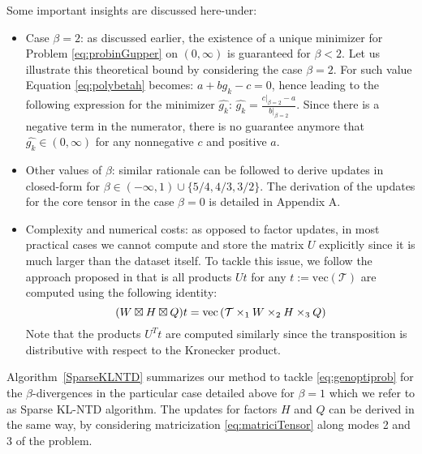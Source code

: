 \documentclass[a4paper, 11pt]{article}
\begin{document}
Some important insights are discussed here-under:
\begin{itemize}
    \item Case $\beta=2$: as discussed earlier, the existence of a unique minimizer for Problem \eqref{eq:probinGupper} on $(0,\infty)$ is guaranteed for $\beta < 2$. Let us illustrate this theoretical bound by considering the case $\beta=2$. For such value Equation \eqref{eq:polybetah} becomes: $a+bg_k-c=0$, hence leading to the following expression for the minimizer $\hat{g_{k}}$: $\hat{g_{k}}=\frac{\left.c\right|_{\beta=2}-a}{\left.b\right|_{\beta=2}}$. Since there is a negative term in the numerator, there is no guarantee anymore that $\hat{g_{k}} \in (0,\infty)$ for any nonnegative $c$ and positive $a$.
    \item Other values of $\beta$: similar rationale can be followed to derive updates in closed-form for $\beta \in (-\infty,1) \cup \{5/4,4/3,3/2\}$. The derivation of the updates for the core tensor in the case $\beta = 0$ is detailed in Appendix A.
    \item Complexity and numerical costs: as opposed to factor updates, in most practical cases we cannot compute and store the matrix $U$ explicitly since it is much larger than the dataset itself. To tackle this issue, we follow the approach proposed in \cite{marmoret2021nonnegative} that is all products $Ut$ for any $t:=\text{vec}\left(\mathcal{T}\right)$ are computed using the following identity:
    \begin{equation}
        (W \boxtimes H \boxtimes Q)t=\text{vec}\left( \mathcal{T} \times_1 W \times_2 H \times_3 Q \right)
    \end{equation}
    Note that the products $U^Tt$ are computed similarly since the transposition is distributive with respect to the Kronecker product.
\end{itemize}
Algorithm~\ref{SparseKLNTD} summarizes our method to tackle \eqref{eq:genoptiprob} for the $\beta$-divergences in the particular case detailed above for $\beta=1$ which we refer to as Sparse KL-NTD algorithm. The updates for factors $H$ and $Q$ can be derived in the same way, by considering matricization \eqref{eq:matriciTensor} along modes 2 and 3 of the problem.
\end{document}
